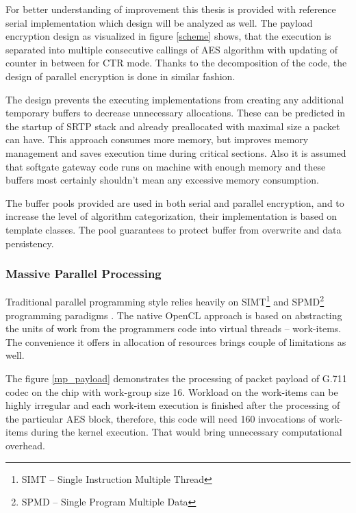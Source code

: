 For better understanding of improvement this thesis is provided with reference
serial implementation which design will be analyzed as well. The payload 
encryption design as visualized in figure \ref{scheme} shows, that the execution
is separated into multiple consecutive callings of AES algorithm with updating
of counter in between for CTR mode. Thanks to the decomposition of the code,
the design of parallel encryption is done in similar fashion.

The design prevents the executing implementations from creating any additional
temporary buffers to decrease unnecessary allocations. These can be predicted in
the startup of SRTP stack and already preallocated with maximal size a packet
can have. This approach consumes more memory, but improves memory management and
saves execution time during critical sections. Also it is assumed that softgate
gateway code runs on machine with enough memory and these buffers most certainly
shouldn't mean any excessive memory consumption. 

The buffer pools provided are used in both serial and parallel encryption,
and to increase the level of algorithm categorization, their implementation is
based on template classes. The pool guarantees to protect buffer from overwrite
and data persistency.


\newpage

\subsubsection*{Massive Parallel Processing}
Traditional parallel programming style relies heavily on SIMT\footnote{ SIMT -- 
Single Instruction Multiple Thread} and SPMD\footnote{ SPMD -- Single Program
Multiple Data} programming paradigms \cite{Flynn:1972}. The native OpenCL 
approach is based on abstracting the units of work from the programmers code 
into virtual threads -- work-items. The convenience it offers in allocation
of resources brings couple of limitations as well. 

The figure \ref{mp_payload} demonstrates the processing of packet payload of 
G.711 codec on the chip with work-group size 16. Workload on the work-items can
be highly irregular and each work-item execution is finished after the 
processing of the particular AES block, therefore, this code will need 160
invocations of work-items during the kernel execution. That would bring
unnecessary computational overhead.    


